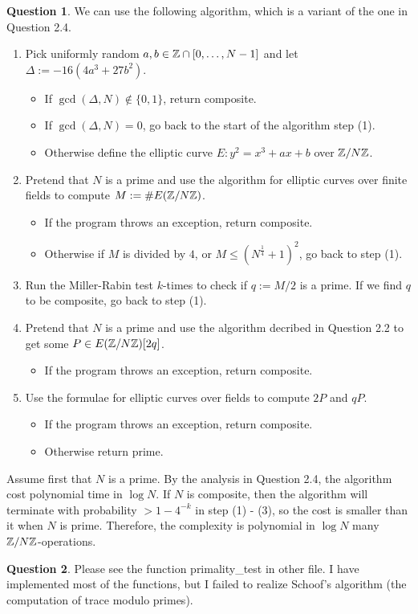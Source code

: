 \documentclass{article}
\theoremstyle{definition}
\newtheorem{question}{Question}[section]
\begin{document}
\begin{question}
    We can use the following algorithm, which is a variant of the one in Question 2.4.
    \begin{enumerate}[(1)]
        \item Pick uniformly random $a, b\in\mathbb{Z}\cap [0, \dots, N-1]$ and let $\Delta := -16(4a^3 + 27b^2)$. \begin{itemize}
            \item If $\gcd(\Delta, N)\notin \{0, 1\}$, return \textsf{composite}.
            \item If $\gcd(\Delta, N) = 0$, go back to the start of the algorithm step (1).
            \item Otherwise define the elliptic curve $E : y^2 = x^3 + ax + b$ over $\mathbb{Z}/N\mathbb{Z}$.
        \end{itemize}
        \item Pretend that $N$ is a prime and use the algorithm for elliptic curves over finite fields to compute $M := \# E(\mathbb{Z}/N\mathbb{Z})$. \begin{itemize}
            \item If the program throws an exception, return \textsf{composite}.
            \item Otherwise if $M$ is divided by $4$, or $M\le (N^\frac{1}{4} + 1)^2$, go back to step (1).
        \end{itemize}
        \item Run the Miller-Rabin test $k$-times to check if $q := M/2$ is a prime. If we find $q$ to be composite, go back to step (1).
        \item Pretend that $N$ is a prime and use the algorithm decribed in Question 2.2 to get some $P\in E(\mathbb{Z}/N\mathbb{Z})[2q]$.
        \begin{itemize}
            \item If the program throws an exception, return \textsf{composite}.
        \end{itemize}
        \item Use the formulae for elliptic curves over fields to compute $2P$ and $qP$.\begin{itemize}
            \item If the program throws an exception, return \textsf{composite}.
            \item Otherwise return \textsf{prime}.
        \end{itemize}
    \end{enumerate}
    Assume first that $N$ is a prime.
    By the analysis in Question 2.4, the algorithm cost polynomial time in $\log N$.
    If $N$ is composite, then the algorithm will terminate with probability $ > 1 - 4^{-k}$ in step (1) - (3),
    so the cost is smaller than it when $N$ is prime.
    Therefore, the complexity is polynomial in $\log N$ many $\mathbb{Z}/N\mathbb{Z}$-operations.
\end{question}

\begin{question}
    Please see the function \textsf{primality\_test} in other file.
    I have implemented most of the functions, but I failed to realize Schoof's algorithm (the computation of trace modulo primes).
\end{question}
\end{document}
